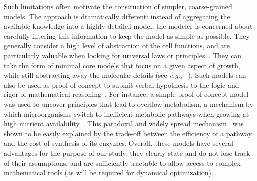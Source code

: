 Such limitations often motivate the construction of simpler, coarse-grained models.
The approach is dramatically different: instead of aggregating the available knowledge into a highly detailed model, the modeler is concerned about carefully filtering this information to keep the model as simple as possible.
They generally consider a high level of abstraction of the cell functions, and are particularly valuable when looking for universal laws or principles~\cite{scott_bacterial_2011,scott_interdependence_2010,scott_emergence_2014}.
They can take the form of minimal core models that focus on a given aspect of growth, while still abstracting away the molecular details (see \textit{e.g.}, ~\cite{spiesser_size_2012}).
Such models can also be used as proof-of-concept to submit verbal hypothesis to the logic and rigor of mathematical reasoning~\cite{servedio_not_2014}.
For instance, a simple proof-of-concept model was used to uncover principles that lead to overflow metabolism, a mechanism by which microorganisms switch to inefficient metabolic pathways when growing at high nutrient availability~\cite{molenaar_shifts_2009}.
This paradoxal and widely spread mechanism~\cite{dijken_kinetics_1993,vemuri_overflow_2006,mckeehan_glycolysis_1982,hsu_cancer_2008} was shown to be easily explained by the trade-off between the efficiency of a pathway and the cost of synthesis of its enzymes.
Overall, these models have several advantages for the purpose of our study: they clearly state and do not lose track of their assumptions, and are sufficiently tractable to allow access to complex mathematical tools (as will be required for dynamical optimization).



